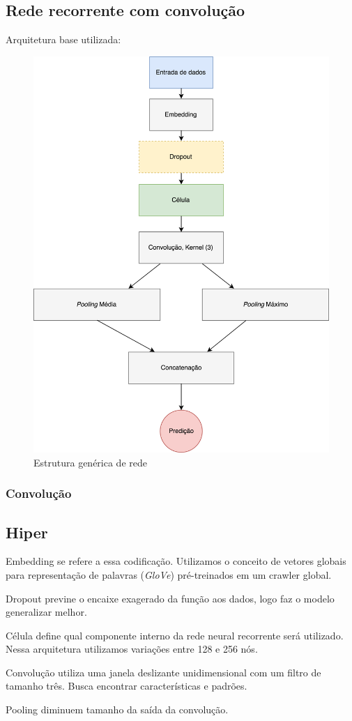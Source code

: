 \documentclass[12pt]{article}
\begin{document}
\subsection{Rede recorrente com convolução}

Arquitetura base utilizada:

\begin{figure}[!htb]
\centering
\includegraphics[width=.5\textwidth]{images/graph.png}
\caption{Estrutura genérica de rede}
\label{fig:graph}
\end{figure}

\subsubsection{Convolução}

\subsection{Hiper}


Embedding se refere a essa codificação. Utilizamos o conceito de vetores globais para representação de palavras (\textit{GloVe}) pré-treinados em um crawler global.

Dropout previne o encaixe exagerado da função aos dados, logo faz o modelo generalizar melhor.

Célula define qual componente interno da rede neural recorrente será utilizado. Nessa arquitetura utilizamos variações entre 128 e 256 nós.

Convolução utiliza uma janela deslizante unidimensional com um filtro de tamanho três. Busca encontrar características e padrões.

Pooling diminuem tamanho da saída da convolução.
\end{document}
